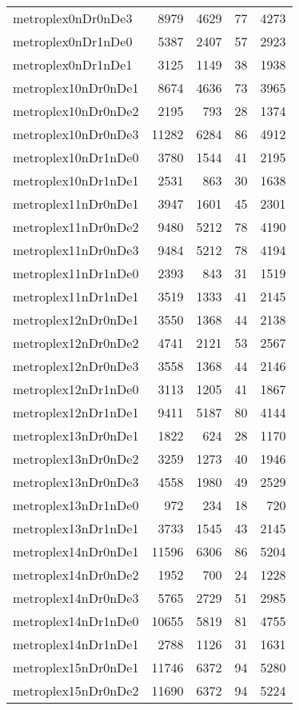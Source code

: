 \begin{longtable}{lrrrr}
metroplex0nDr0nDe3 & 8979 & 4629 & 77 & 4273 \\
metroplex0nDr1nDe0 & 5387 & 2407 & 57 & 2923 \\
metroplex0nDr1nDe1 & 3125 & 1149 & 38 & 1938 \\
metroplex10nDr0nDe1 & 8674 & 4636 & 73 & 3965 \\
metroplex10nDr0nDe2 & 2195 & 793 & 28 & 1374 \\
metroplex10nDr0nDe3 & 11282 & 6284 & 86 & 4912 \\
metroplex10nDr1nDe0 & 3780 & 1544 & 41 & 2195 \\
metroplex10nDr1nDe1 & 2531 & 863 & 30 & 1638 \\
metroplex11nDr0nDe1 & 3947 & 1601 & 45 & 2301 \\
metroplex11nDr0nDe2 & 9480 & 5212 & 78 & 4190 \\
metroplex11nDr0nDe3 & 9484 & 5212 & 78 & 4194 \\
metroplex11nDr1nDe0 & 2393 & 843 & 31 & 1519 \\
metroplex11nDr1nDe1 & 3519 & 1333 & 41 & 2145 \\
metroplex12nDr0nDe1 & 3550 & 1368 & 44 & 2138 \\
metroplex12nDr0nDe2 & 4741 & 2121 & 53 & 2567 \\
metroplex12nDr0nDe3 & 3558 & 1368 & 44 & 2146 \\
metroplex12nDr1nDe0 & 3113 & 1205 & 41 & 1867 \\
metroplex12nDr1nDe1 & 9411 & 5187 & 80 & 4144 \\
metroplex13nDr0nDe1 & 1822 & 624 & 28 & 1170 \\
metroplex13nDr0nDe2 & 3259 & 1273 & 40 & 1946 \\
metroplex13nDr0nDe3 & 4558 & 1980 & 49 & 2529 \\
metroplex13nDr1nDe0 & 972 & 234 & 18 & 720 \\
metroplex13nDr1nDe1 & 3733 & 1545 & 43 & 2145 \\
metroplex14nDr0nDe1 & 11596 & 6306 & 86 & 5204 \\
metroplex14nDr0nDe2 & 1952 & 700 & 24 & 1228 \\
metroplex14nDr0nDe3 & 5765 & 2729 & 51 & 2985 \\
metroplex14nDr1nDe0 & 10655 & 5819 & 81 & 4755 \\
metroplex14nDr1nDe1 & 2788 & 1126 & 31 & 1631 \\
metroplex15nDr0nDe1 & 11746 & 6372 & 94 & 5280 \\
metroplex15nDr0nDe2 & 11690 & 6372 & 94 & 5224 \\

\end{longtable}
